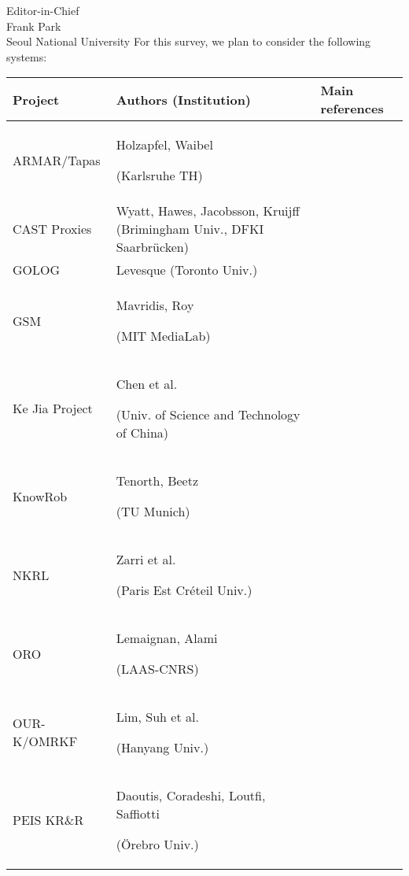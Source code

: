\documentclass{letter}
\begin{document}
\begin{letter}{Editor-in-Chief \\ Frank Park \\ Seoul National University}
For this survey, we plan to consider the following systems:

\begin{tabular}{p{2.8cm}p{8cm}p{1.5cm}}
\toprule
{\bf Project} & {\bf Authors (Institution)} & Main references \\
\midrule
ARMAR/Tapas &  Holzapfel, Waibel \par (Karlsruhe TH) &  \cite{Holzapfel2008}\\
CAST Proxies &  Wyatt, Hawes, Jacobsson, Kruijff (Brimingham Univ., DFKI Saarbrücken) &  \cite{Jacobsson2008} \\
GOLOG & Levesque (Toronto Univ.) & \cite{levesque1997golog} \\
GSM &  Mavridis, Roy \par (MIT MediaLab) & \cite{Mavridis2006} \\
Ke Jia Project & Chen et al. \par (Univ. of Science and Technology of China) &  \cite{Chen2010} \\
{\sc KnowRob} &  Tenorth, Beetz \par (TU Munich) &   \cite{Tenorth2009a} \\
NKRL &  Zarri et al. \par (Paris Est Créteil Univ.) &  \cite{Sabri2011} \\
ORO &  Lemaignan, Alami \par (LAAS-CNRS) &  \cite{Lemaignan2010} \\
OUR-K/OMRKF &  Lim, Suh et al. \par (Hanyang Univ.) &   \cite{Lim2011, Suh2007} \\
PEIS KR\&R &  Daoutis, Coradeshi, Loutfi, Saffiotti \par (Örebro Univ.) &  \cite{Daoutis2009} \\

\bottomrule


\end{tabular}
\end{letter}
\end{document}
